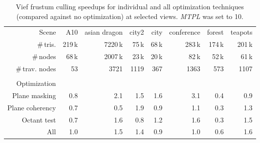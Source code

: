 \documentclass[report,11pt]{elsarticle}
\begin{document}
\begin{table*}[t]
\begin{center}
\begin{tabular}{| r || r | r | r | r | r | r | r |}
	\hline
	Scene                                   & A10 & asian dragon & city2 & city & conference & forest & teapots \\
	\#\,tris.                               & 219\,k & 7220\,k & 75\,k & 68\,k & 283\,k & 174\,k & 201\,k \\
	\#\,nodes                               & 68\,k & 2007\,k & 23\,k & 20\,k & 82\,k & 52\,k & 61\,k \\
	\#\,trav. nodes                         & 53  & 3721 & 1119 & 367 & 1363  & 573 & 1107 \\
	\diagbox[width=10em]{\\Optimization}{} &&&&&&& \\
\hline
\hline
	Plane masking                           & 0.8 & 2.1 & 1.5 & 1.6 & 3.1 & 0.4 & 0.9 \\
\hline
	Plane coherency                         & 0.7 & 0.5 & 1.9 & 0.9 & 1.1 & 0.3 & 1.3 \\
\hline
	Octant test                             & 0.7 & 1.6 & 0.8 & 1.2 & 1.6 & 0.3 & 1.5 \\
\hline
	All                                     & 1.0 & 1.5 & 1.4 & 0.9 & 1.0 & 0.6 & 1.6 \\
\hline
\end{tabular}
\end{center}
	\caption{Vief frustum culling speedups for individual and all optimization techniques (compared against no optimization) at selected views. \emph{MTPL} was set to 10.}
	\label{TAB:optim}
\end{table*}
\end{document}
